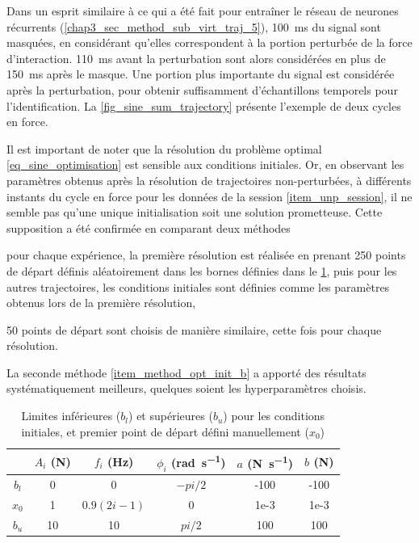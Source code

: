 Dans un esprit similaire à ce qui a été fait pour entraîner le réseau de neurones récurrents (\cref{chap3_sec_method_sub_virt_traj_5}), \SI{100}{\milli\second} du signal sont masquées, en considérant qu'elles correspondent à la portion perturbée de la force d'interaction. \SI{110}{\milli\second} avant la perturbation sont alors considérées en plus de \SI{150}{\milli\second} après le masque. Une portion plus importante du signal est considérée après la perturbation, pour obtenir suffisamment d'échantillons temporels pour l'identification. La \cref{fig_sine_sum_trajectory} présente l'exemple de deux cycles en force. 



Il est important de noter que la résolution du problème optimal \cref{eq_sine_optimisation} est sensible aux conditions initiales. Or, en observant les paramètres obtenus après la résolution de trajectoires non-perturbées, à différents instants du cycle en force pour les données de la session \cref{item_unp_session}, il ne semble pas qu'une unique initialisation soit une solution prometteuse. Cette supposition a été confirmée en comparant deux méthodes 
\begin{enumerate*}[label=\alph*)]
	\item\label{item_method_opt_init_a} pour chaque expérience, la première résolution est réalisée en prenant 250 points de départ définis aléatoirement dans les bornes définies dans le \cref{tab_sine_opt_intials}, puis pour les autres trajectoires, les conditions initiales sont définies comme les paramètres obtenus lors de la première résolution,
	\item\label{item_method_opt_init_b} 50 points de départ sont choisis de manière similaire, cette fois pour chaque résolution.
\end{enumerate*}
La seconde méthode \cref{item_method_opt_init_b} a apporté des résultats systématiquement meilleurs, quelques soient les hyperparamètres choisis.

\begin{table}[htbp] 
	\begin{center}
		\begin{tabular}{|c|c|c|c|c|c|}
			\hline  
			& $A_i$ (\si{\newton}) & $f_i$ (\si{\hertz}) & $\phi_i$ (\si{\radian\per\second}) & $a$ (\si{\newton\per\second}) & $b$ (\si{\newton}) \\
			\hline
			$b_l$ & 0 & 0 & $ -pi/2 $ & -100 & -100 \\
			\hline
			$x_0$ & 1 & $ 0.9(2i-1) $  & 0 & 1e-3 & 1e-3 \\
			\hline
			$b_u$ & 10 & 10 & $ pi/2 $ & 100 & 100 \\
			\hline
		\end{tabular}
	\end{center}
	\caption[Limites et conditions initiales des paramètres de la somme de sinusoïdes, pour la résolution de l'optimisation]{Limites inférieures ($b_l$) et supérieures ($b_u$) pour les conditions initiales, et premier point de départ défini manuellement ($ x_0 $)}
	\label{tab_sine_opt_intials}	
\end{table}

